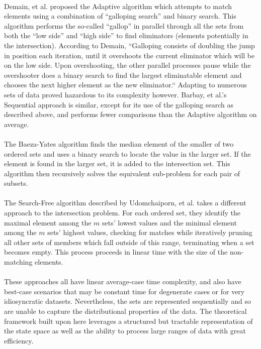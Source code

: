 \documentclass[11pt,letterpaper]{article}
\begin{document}
\paragraph{}
Demain, et al. proposed the Adaptive algorithm which attempts to
match elements using a combination of ``galloping search'' and binary
search.  This algorithm performs the so-called ``gallop'' in parallel through all
the sets from both the ``low side'' and ``high side'' to find eliminators
(elements potentially in the intersection).  According to Demain,
``Galloping consists of doubling the jump in position each iteration,
until it overshoots the current eliminator which will be on the low side.
Upon overshooting, the other parallel processes pause while the overshooter
does a binary search to find the largest eliminatable element and chooses
the next higher element as the new eliminator.``
Adapting to numerous sets of data proved hazardous
to its complexity however.  Barbay, et al.'s Sequential approach is similar,
except for its use of the galloping search as described above, and performs
fewer comparisons than the Adaptive algorithm on average.
	
\paragraph{}
The Baeza-Yates algorithm finds the median element of the smaller of
two ordered sets and uses a binary search to locate the value in the larger set.
If the element is found in the larger set, it is added to the intersection set.
This algorithm then recursively solves the equivalent sub-problem for each
pair of subsets. 

\paragraph{}
The Search-Free algorithm described by Udomchaiporn, et al. takes a different
approach to the intersection problem.  For each ordered set, they identify the
maximal element among the $m$ sets' lowest values and the minimal element
among the $m$ sets' highest values, checking for matches while iteratively
pruning all other sets of members which fall outside of this range, terminating
when a set becomes empty.  This process proceeds in linear time with
the size of the non-matching elements.

\paragraph{}
These approaches all have linear average-case time complexity, and also have
best-case scenarios that may be constant time for degenerate cases or for
very idiosyncratic datasets.  Nevertheless, the sets are represented sequentially
and so are unable to capture the distributional properties of the data.  The
theoretical framework built upon here leverages a structured but tractable
representation of the state space as well as the ability to process large ranges of
data with great efficiency.
\end{document}
